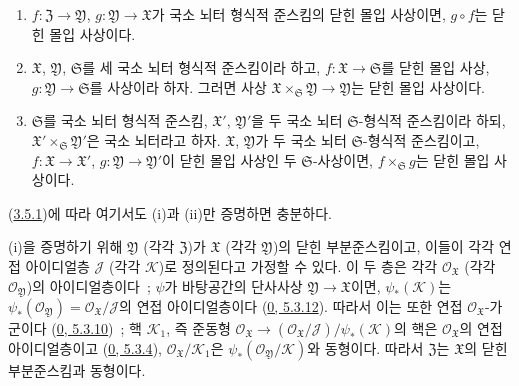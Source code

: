 \begin{proposition}[10.14.5]
\label{I.10.14.5-ko}
\begin{enumerate}
  \item[\rm{(i)}] $f:\mathfrak{Z}\to\mathfrak{Y}$,
  $g:\mathfrak{Y}\to\mathfrak{X}$가 국소 뇌터 형식적 준스킴의
  닫힌 몰입 사상이면, $g\circ f$는 닫힌 몰입 사상이다.

  \item[\rm{(ii)}] $\mathfrak{X}$, $\mathfrak{Y}$,
  $\mathfrak{S}$를 세 국소 뇌터 형식적 준스킴이라 하고,
  $f:\mathfrak{X}\to\mathfrak{S}$를 닫힌 몰입 사상,
  $g:\mathfrak{Y}\to\mathfrak{S}$를 사상이라 하자. 그러면 사상
  $\mathfrak{X}\times_{\mathfrak{S}}\mathfrak{Y}\to\mathfrak{Y}$는
  닫힌 몰입 사상이다.
  \item[\rm{(iii)}] $\mathfrak{S}$를 국소 뇌터 형식적 준스킴,
  $\mathfrak{X}'$, $\mathfrak{Y}'$을 두 국소 뇌터
  $\mathfrak{S}$-형식적 준스킴이라 하되,
  $\mathfrak{X}'\times_{\mathfrak{S}}\mathfrak{Y}'$은 국소 뇌터라고
  하자. $\mathfrak{X}$, $\mathfrak{Y}$가 두 국소 뇌터
  $\mathfrak{S}$-형식적 준스킴이고,
  $f:\mathfrak{X}\to\mathfrak{X}'$, $g:\mathfrak{Y}\to\mathfrak{Y}'$이
  닫힌 몰입 사상인 두 $\mathfrak{S}$-사상이면,
  $f\times_{\mathfrak{S}}g$는 닫힌 몰입 사상이다.
\end{enumerate}
\end{proposition}

(\hyperref[I.3.5.1-ko]{3.5.1})에 따라 여기서도 (i)과 (ii)만 증명하면
충분하다.

(i)을 증명하기 위해 $\mathfrak{Y}$ (각각 $\mathfrak{Z}$)가
$\mathfrak{X}$ (각각 $\mathfrak{Y}$)의 닫힌 부분준스킴이고, 이들이
각각 연접 아이디얼층 $\mathscr{J}$ (각각 $\mathscr{K}$)로 정의된다고
가정할 수 있다. 이 두 층은 각각 $\mathscr{O}_{\mathfrak{X}}$ (각각
$\mathscr{O}_{\mathfrak{Y}}$)의 아이디얼층이다~; $\psi$가 바탕공간의 단사사상
$\mathfrak{Y}\to\mathfrak{X}$이면, $\psi_*(\mathscr{K})$는
$\psi_*(\mathscr{O}_{\mathfrak{Y}})
=\mathscr{O}_{\mathfrak{X}}/\mathscr{J}$의 연접 아이디얼층이다
(\hyperref[0.5.3.12-ko]{0, 5.3.12}). 따라서 이는 또한 연접
$\mathscr{O}_{\mathfrak{X}}$-가군이다
(\hyperref[0.5.3.10-ko]{0, 5.3.10})~; 핵 $\mathscr{K}_1$, 즉 준동형
$\mathscr{O}_{\mathfrak{X}}\to
(\mathscr{O}_{\mathfrak{X}}/\mathscr{J})/\psi_*(\mathscr{K})$의 핵은
$\mathscr{O}_{\mathfrak{X}}$의 연접 아이디얼층이고
(\hyperref[0.5.3.4-ko]{0, 5.3.4}),
$\mathscr{O}_{\mathfrak{X}}/\mathscr{K}_1$은
$\psi_*(\mathscr{O}_{\mathfrak{Y}}/\mathscr{K})$와 동형이다. 따라서
$\mathfrak{Z}$는 $\mathfrak{X}$의 닫힌 부분준스킴과 동형이다.

